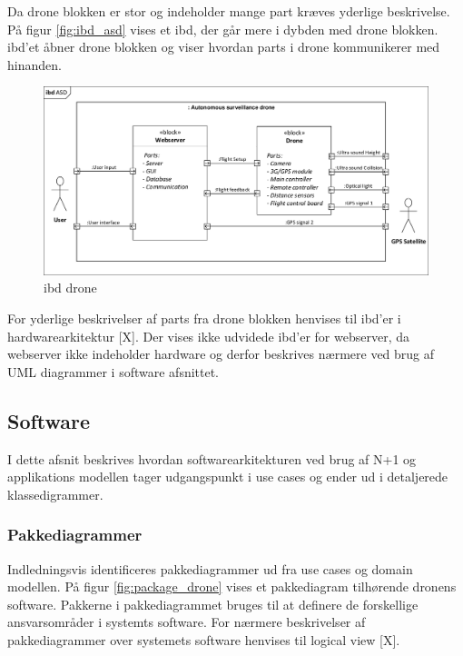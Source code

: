 Da drone blokken er stor og indeholder mange part kræves yderlige beskrivelse. På figur \ref{fig:ibd_asd} vises et ibd, der går mere i dybden med drone blokken. ibd'et åbner drone blokken og viser hvordan parts i drone kommunikerer med hinanden. 

\begin{figure}[H]
	\centering
	\includegraphics[width=1\textwidth]{Billeder/Projektbeskrivelse/ibd1_overordnet.pdf}
	\caption{ibd drone}
	\label{fig:ibd_drone}
\end{figure}


For yderlige beskrivelser af parts fra drone blokken henvises til ibd'er i hardwarearkitektur [X].
Der vises ikke udvidede ibd'er for webserver, da webserver ikke indeholder hardware og derfor beskrives nærmere ved brug af UML diagrammer i software afsnittet.



\newpage

\subsection{Software}

I dette afsnit beskrives hvordan softwarearkitekturen ved brug af N+1 og applikations modellen tager udgangspunkt i use cases og ender ud i detaljerede klassedigrammer. 
   
\subsubsection*{Pakkediagrammer}
\vspace{-0.3cm}	
Indledningsvis identificeres pakkediagrammer ud fra use cases og domain modellen. På figur \ref{fig:package_drone} vises et pakkediagram tilhørende dronens software. Pakkerne i pakkediagrammet bruges til at definere de forskellige ansvarsområder i systemts software. For nærmere beskrivelser af pakkediagrammer over systemets software henvises til logical view [X].
 
